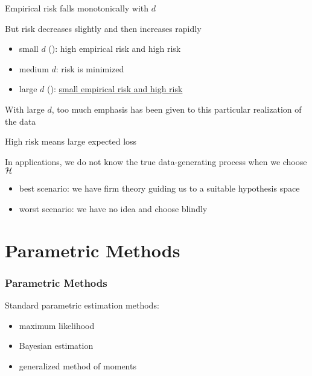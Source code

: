 \begin{frame}
    
    \vspace{2em}
    Empirical risk falls monotonically with $d$
    
    \vspace{.7em}
    But risk decreases slightly and then increases rapidly

    \begin{itemize}
        \item small $d$ (): high empirical risk and high risk
        \item medium $d$: risk is minimized
        \item large $d$ (): \underline{small empirical risk and high risk}
    \end{itemize}
    
    With large $d$, too much emphasis has been given to this particular
    realization of the data 

    High risk means large expected loss

\end{frame}

\begin{frame}

    In applications, we do not know the
    true data-generating process when we choose $\mathcal H$
    \begin{itemize}
        \item best scenario: we have firm theory guiding us to 
        a suitable hypothesis space
        \item worst scenario: we have no idea and choose blindly
    \end{itemize}


\end{frame}

\section{Parametric Methods}

\begin{frame}\frametitle{Parametric Methods}
    Standard parametric estimation methods:
    \begin{itemize}
        \item maximum likelihood
        \item Bayesian estimation
        \item generalized method
    of moments
    \end{itemize}

\end{frame}

